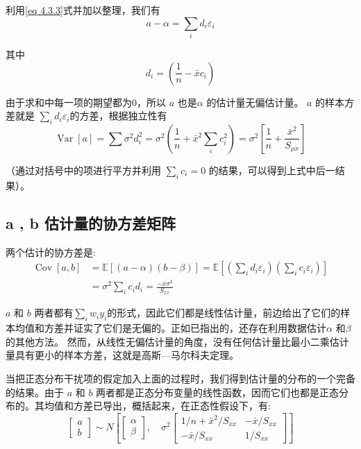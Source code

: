 利用\ref{eq 4.3.3}式并加以整理，我们有
$$ a-\alpha=\sum_{i} d_{i} \varepsilon_{i} $$

其中
$$ d_{i}=\left(\frac{1}{n}-\bar{x} c_{i}\right) $$

由于求和中每一项的期望都为0，所以 $a$ 也是$\alpha$ 的估计量无偏估计量。 $a$ 的样本方差就是
$\sum_{i} d_{i} \varepsilon_{i} $的方差，根据独立性有
$$ \operatorname{Var}[a]=\sum \sigma^{2} d_{i}^{2}=\sigma^{2}\left(\frac{1}{n}+\bar{x}^{2} \sum_{i} c_{i}^{2}\right)
       =\sigma^{2}\left[\frac{1}{n}+\frac{\bar{x}^{2}}{S_{\mu x}}\right] $$

（通过对括号中的项进行平方并利用 $ \sum_{i}c_{i} = 0 $ 的结果，可以得到上式中后一结果）。

{\subsection{a ,  b 估计量的协方差矩阵}  }

两个估计的协方差是:
\begin{align*}
    \operatorname{Cov}[a, b] & = \mathbb{E}[(a-\alpha)(b-\beta)]=\mathbb{E}\left[\left(\sum_{i} d_{i} \varepsilon_{i}\right)\left(\sum_{i} c_{i} 
     \varepsilon_{i}\right)\right] \\
    &=\sigma^{2} \sum_{i} c_{i} d_{i}=\frac{-\bar{x} \sigma^{2}}{S_{x x}}
\end{align*}

$a$ 和 $b$ 两者都有$\sum_{i} w_{i} y_{i} $的形式，因此它们都是线性估计量，前边给出了它们的样本均值和方差并证实了它们是无偏的。正如已指出的，还存在利用数据估计$ \alpha $ 和$ \beta $ 的其他方法。
然而，从线性无偏估计量的角度，没有任何估计量比最小二乘估计量具有更小的样本方差，这就是{\heiti 高斯—马尔科夫定理}。

当把正态分布干扰项的假定加入上面的过程时，我们得到估计量的分布的一个完备的结果。由于 $ a $ 和 $ b $ 两者都是正态分布变量的线性函数，因而它们也都是正态分布的。其均值和方差已导出，概括起来，在正态性假设下，有:
$$
\left[\begin{array}{l}
a \\
b \end{array}\right] \sim N\left[\left[\begin{array}{l}
\alpha \\
\beta
\end{array}\right], \quad \sigma^{2}\left[\begin{array}{ll}
1 / n+\bar{x}^{2} / S_{x x} & -\bar{x} / S_{x x} \\
-\bar{x} / S_{x x} & 1 / S_{x x}
\end{array}\right]\right] $$

